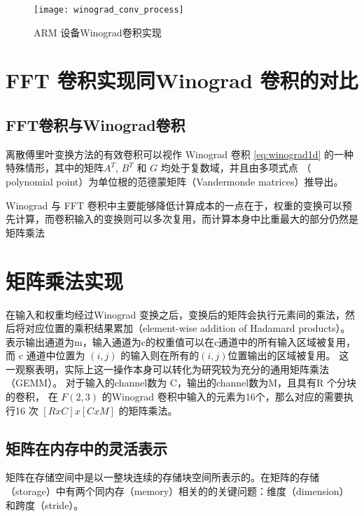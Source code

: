 \begin{figure}
\centering
\texttt{[image: winograd\_conv\_process]}
\caption{ARM 设备Winograd卷积实现}
\label{fig:winograd_full_procedure}
\end{figure}

\section{FFT 卷积实现同Winograd 卷积的对比}


\subsection{FFT卷积与Winograd卷积}
离散傅里叶变换方法的有效卷积可以视作 Winograd 卷积 \ref{eq:winograd1d} 的一种特殊情形，其中的矩阵$A^T$, $B^T$ 和 $G$ 均处于复数域，并且由多项式点
（ polynomial point）为单位根的范德蒙矩阵（Vandermonde matrices）推导出。

Winograd 与 FFT 卷积中主要能够降低计算成本的一点在于，权重的变换可以预先计算，而卷积输入的变换则可以多次复用，而计算本身中比重最大的部分仍然是矩阵乘法


\section{矩阵乘法实现}

在输入和权重均经过Winograd 变换之后，变换后的矩阵会执行元素间的乘法，然后将对应位置的乘积结果累加（element-wise addition of Hadamard products）。
表示输出通道为m，输入通道为c的权重值可以在c通道中的所有输入区域被复用，
而 c 通道中位置为 $(i, j)$ 的输入则在所有的$(i,j )$位置输出的区域被复用。 这一观察表明，实际上这一操作本身可以转化为研究较为充分的通用矩阵乘法（GEMM）。
对于输入的channel数为 C，输出的channel数为M，且具有R 个分块的卷积， 在 $F(2, 3)$ 的Winograd 卷积中输入的元素为16个，那么对应的需要执行16 次 $[RxC]x[CxM] $
的矩阵乘法。


\subsection{矩阵在内存中的灵活表示}
矩阵在存储空间中是以一整块连续的存储块空间所表示的。在矩阵的存储（storage）中有两个同内存（memory）相关的的关键问题：维度（dimension）和跨度（stride）。

